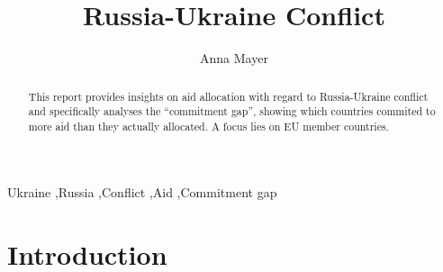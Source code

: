 \documentclass[11pt,preprint, authoryear]{elsarticle}
\numberwithin{equation}{section}
\numberwithin{figure}{section}
\numberwithin{table}{section}
\begin{document}
\begin{frontmatter}  %

\title{Russia-Ukraine Conflict}





\author[Add1]{Anna Mayer}





\address[Add1]{Stellenbosch University}


\begin{abstract}
\small{
This report provides insights on aid allocation with regard to
Russia-Ukraine conflict and specifically analyses the ``commitment
gap'', showing which countries commited to more aid than they actually
allocated. A focus lies on EU member countries.
}
\end{abstract}

\vspace{1cm}


\begin{keyword}
\footnotesize{
Ukraine \sep Russia \sep Conflict \sep Aid \sep Commitment gap \\
\vspace{0.3cm}
}
\end{keyword}



\vspace{0.5cm}

\end{frontmatter}

\setcounter{footnote}{0}



\pagestyle{fancy}
\chead{}
\rhead{}
\lfoot{}
\lhead{}
\cfoot{}


\headsep 35pt %




\hypertarget{introduction}{%
\section{\texorpdfstring{Introduction
\label{Introduction}}{Introduction }}\label{introduction}}
\end{document}
